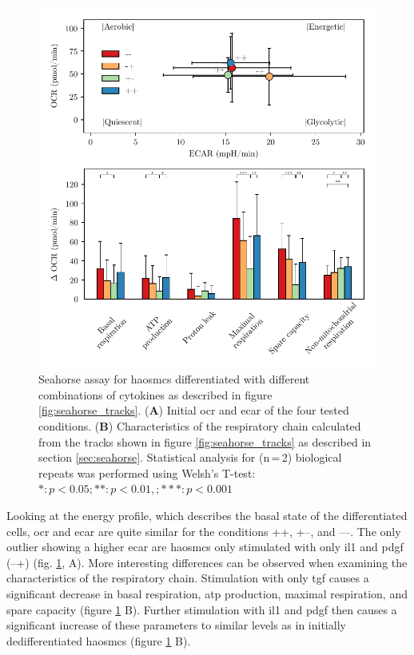     \begin{figure}[h!]
    \capstart
        \centering
    	\includegraphics{Abbildung/Seahorse_summary_merged.pdf}

    	\begin{minipage}{\captionwidth}
    		\caption[energy_profile]{ \newline Seahorse assay for \acp{haosmc} differentiated with different combinations of cytokines as described in figure \ref{fig:seahorse_tracks}.
            (\textbf{A}) Initial \ac{ocr} and \ac{ecar} of the four tested conditions. (\textbf{B}) Characteristics of the respiratory chain calculated from the tracks shown in figure \ref{fig:seahorse_tracks} as described in section \ref{sec:seahorse}. Statistical analysis for (n\,=\,2) biological repeats was performed using Welsh's T-test: $*: p < 0.05; **: p < 0.01, ; ***: p < 0.001$}
    		\label{fig:energy_profile}
    	\end{minipage}
    \end{figure}

    Looking at the energy profile, which describes the basal state of the differentiated cells, \ac{ocr} and \ac{ecar} are quite similar for the conditions ++, +–, and ––. The only outlier showing a higher \ac{ecar} are \acp{haosmc} only stimulated with only \ac{il1} and \ac{pdgf} (–+) (fig. \ref{fig:energy_profile}, A). More interesting differences can be observed when examining the characteristics of the respiratory chain. Stimulation with only \ac{tgf} causes a significant decrease in basal respiration, \ac{atp} production, maximal respiration, and spare capacity (figure \ref{fig:energy_profile} B). Further stimulation with \ac{il1} and \ac{pdgf} then causes a significant increase of these parameters to similar levels as in initially dedifferentiated \acp{haosmc} (figure \ref{fig:energy_profile} B).

